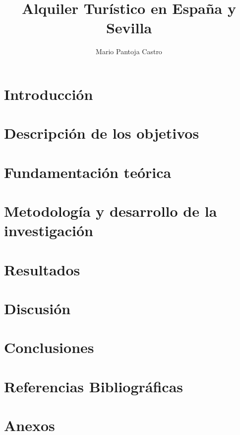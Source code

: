 \documentclass[a4paper]{article}
\title{Alquiler Turístico en España y Sevilla}
\author{Mario Pantoja Castro}
\begin{document}
    \begin{titlepage}

        \maketitle
        
    \end{titlepage}

    \tableofcontents

    \section{Introducción}
    \section{Descripción de los objetivos}
    \section{Fundamentación teórica}
    \section{Metodología y desarrollo de la investigación}
    \section{Resultados}
    \section{Discusión}
    \section{Conclusiones}
    \section{Referencias Bibliográficas}
    \section{Anexos}
\end{document}
